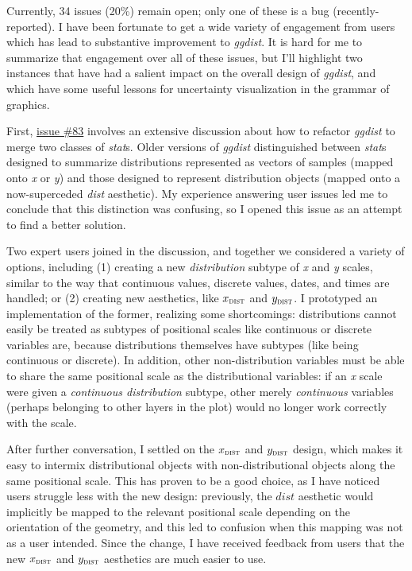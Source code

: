\documentclass[journal]{vgtc}                     %
\begin{document}
Currently, 34 issues (20\%) remain open; only one of these is a bug (recently-reported). 
I have been fortunate to get a wide variety of engagement from users which has lead to substantive improvement to \textit{ggdist}. It is hard for me to summarize that engagement over all of these issues, but I'll highlight two instances that have had a salient impact on the overall design of \textit{ggdist}, and which have some useful lessons for uncertainty visualization in the grammar of graphics.

First, \href{https://github.com/mjskay/ggdist/issues/83}{issue \#83} involves an extensive discussion about how to refactor \textit{ggdist} to merge two classes of \textit{stat}s. Older versions of \textit{ggdist} distinguished between \textit{stat}s designed to summarize distributions represented as vectors of samples (mapped onto \textit{x} or \textit{y}) and those designed to represent distribution objects (mapped onto a now-superceded \textit{dist} aesthetic). My experience answering user issues led me to conclude that this distinction was confusing, so I opened this issue as an attempt to find a better solution. 

Two expert users joined in the discussion, and together we considered a variety of options, including (1) creating a new \textit{distribution} subtype of \textit{x} and \textit{y} scales, similar to the way that continuous values, discrete values, dates, and times are handled; or (2) creating new aesthetics, like $x_\textsc{dist}$ and $y_\textsc{dist}$. I prototyped an implementation of the former, realizing some shortcomings: distributions cannot easily be treated as subtypes of positional scales like continuous or discrete variables are, because distributions themselves have subtypes (like being continuous or discrete). In addition, other non-distribution variables must be able to share the same positional scale as the distributional variables: if an \textit{x} scale were given a \textit{continuous distribution} subtype, other merely \textit{continuous} variables (perhaps belonging to other layers in the plot) would no longer work correctly with the scale.

After further conversation, I settled on the $x_\textsc{dist}$ and $y_\textsc{dist}$ design, which makes it easy to intermix distributional objects with non-distributional objects along the same positional scale. This has proven to be a good choice, as I have noticed users struggle less with the new design: previously, the $\textit{dist}$ aesthetic would implicitly be mapped to the relevant positional scale depending on the orientation of the geometry, and this led to confusion when this mapping was not as a user intended. Since the change, I have received feedback from users that the new $x_\textsc{dist}$ and $y_\textsc{dist}$ aesthetics are much easier to use.
\end{document}
